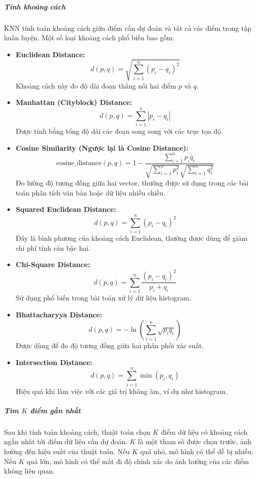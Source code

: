 \documentclass[a4paper,12pt]{article}
\begin{document}
\subparagraph{Tính khoảng cách}  
\hspace{5mm}KNN tính toán khoảng cách giữa điểm cần dự đoán và tất cả các điểm trong tập huấn luyện. Một số loại khoảng cách phổ biến bao gồm:
\begin{itemize}
    \item \textbf{Euclidean Distance:}
    \[
    d(p, q) = \sqrt{\sum_{i=1}^{n} (p_i - q_i)^2}
    \]
    Khoảng cách này đo độ dài đoạn thẳng nối hai điểm \(p\) và \(q\).
    
    \item \textbf{Manhattan (Cityblock) Distance:}
    \[
    d(p, q) = \sum_{i=1}^{n} |p_i - q_i|
    \]
    Được tính bằng tổng độ dài các đoạn song song với các trục tọa độ.

    \item \textbf{Cosine Similarity (Ngược lại là Cosine Distance):}
    \[
    \text{cosine\_distance}(p, q) = 1 - \frac{\sum_{i=1}^n p_i q_i}{\sqrt{\sum_{i=1}^n p_i^2} \sqrt{\sum_{i=1}^n q_i^2}}
    \]
    Đo lường độ tương đồng giữa hai vector, thường được sử dụng trong các bài toán phân tích văn bản hoặc dữ liệu nhiều chiều.

    \item \textbf{Squared Euclidean Distance:}
    \[
    d(p, q) = \sum_{i=1}^{n} (p_i - q_i)^2
    \]
    Đây là bình phương của khoảng cách Euclidean, thường được dùng để giảm chi phí tính căn bậc hai.

    \item \textbf{Chi-Square Distance:}
    \[
    d(p, q) = \sum_{i=1}^{n} \frac{(p_i - q_i)^2}{p_i + q_i}
    \]
    Sử dụng phổ biến trong bài toán xử lý dữ liệu histogram.

    \item \textbf{Bhattacharyya Distance:}
    \[
    d(p, q) = -\ln \left(\sum_{i=1}^{n} \sqrt{p_i q_i}\right)
    \]
    Được dùng để đo độ tương đồng giữa hai phân phối xác suất.

    \item \textbf{Intersection Distance:}
    \[
    d(p, q) = \sum_{i=1}^{n} \min(p_i, q_i)
    \]
    Hiệu quả khi làm việc với các giá trị không âm, ví dụ như histogram.
\end{itemize}

\subparagraph{Tìm \(K\) điểm gần nhất}  
\hspace{5mm}Sau khi tính toán khoảng cách, thuật toán chọn \(K\) điểm dữ liệu có khoảng cách ngắn nhất tới điểm dữ liệu cần dự đoán. \(K\) là một tham số được chọn trước, ảnh hưởng đến hiệu suất của thuật toán. Nếu \(K\) quá nhỏ, mô hình có thể dễ bị nhiễu. Nếu \(K\) quá lớn, mô hình có thể mất đi độ chính xác do ảnh hưởng của các điểm không liên quan.
\end{document}
